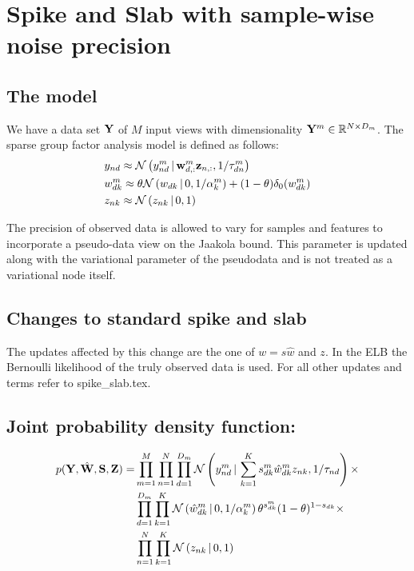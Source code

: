 \documentclass[10pt, a4paper,openany]{report}
\begin{document}
\section{Spike and Slab with sample-wise noise precision}

\subsection{The model}
We have a data set ${\bf Y}$ of $M$ input views with dimensionality ${\bf Y}^m \in \mathbb{R}^{N \times D_m}$. The sparse group factor analysis model is defined as follows:
\begin{align}
&y_{nd} \approx \mathcal{N}\left(y_{nd}^m \,|\, {\bf w}_{d,:}^m{\bf z}_{n,:},1/\tau_{dn}^m\right) \\
&w_{dk}^m \approx \theta\mathcal{N}\left(w_{dk} \,|\, 0,1/\alpha_k^m\right) + (1-\theta)\delta_0(w_{dk}^m)\\
&z_{nk} \approx \mathcal{N}\left(z_{nk} \,|\, 0,1\right)
\end{align}

The precision of observed data is allowed to vary for samples and features to incorporate a pseudo-data view on the Jaakola bound. This parameter is updated along with the variational parameter of the pseudodata and is not treated as a variational node itself.

\subsection{Changes to standard spike and slab}

The updates affected by this change are the one of $w=s\hat{w}$ and $z$. In the ELB the Bernoulli likelihood of the truly observed data is used.
For all other updates and terms refer to spike\_slab.tex.
\subsection{Joint probability density function:}

\begin{align*}
p({\bf Y},\hat{{\bf W}},{\bf S},{\bf Z}) = &\prod_{m=1}^{M} \prod_{n=1}^{N} \prod_{d=1}^{D_m} \mathcal{N}\left(y_{nd}^m \,|\, \sum_{k=1}^{K} s_{dk}^m \hat{w}_{dk}^m z_{nk},1/\tau_{nd}\right) \times \\
&\prod_{d=1}^{D_m}\prod_{k=1}^{K} \mathcal{N}\left(\hat{w}_{dk}^m \,|\, 0,1/\alpha_k^m\right) \theta^{s_{dk}^m}(1-\theta)^{1-s_{dk}} \times \\
&\prod_{n=1}^{N}\prod_{k=1}^{K} \mathcal{N}\left(z_{nk} \,|\, 0,1\right)
\end{align*}
\end{document}
